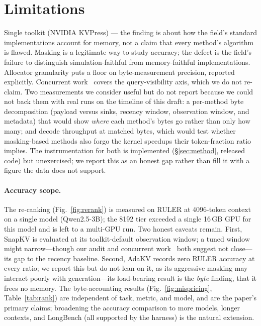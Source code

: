 \documentclass[11pt]{article}
\begin{document}
\section{Limitations}
\label{sec:limitations}
Single toolkit (NVIDIA KVPress) --- the finding is about how the field's standard implementations
account for memory, not a claim that every method's algorithm is flawed. Masking is a legitimate way
to study accuracy; the defect is the field's failure to distinguish simulation-faithful from
memory-faithful implementations. Allocator granularity puts a floor on byte-measurement precision,
reported explicitly. Concurrent work~\citep{luo2026queryvisibility} covers the query-visibility axis,
which we do not re-claim. Two measurements we consider useful but do not report because we could not
back them with real runs on the timeline of this draft: a per-method byte decomposition (payload
versus sinks, recency window, observation window, and metadata) that would show \emph{where} each
method's bytes go rather than only how many; and decode throughput at matched bytes, which would test
whether masking-based methods also forgo the kernel speedups their token-fraction ratio implies. The
instrumentation for both is implemented (\S\ref{sec:method}, released code) but unexercised; we report
this as an honest gap rather than fill it with a figure the data does not support.

\paragraph{Accuracy scope.} The re-ranking (Fig.~\ref{fig:rerank}) is measured on RULER at
4096-token context on a single model (Qwen2.5-3B); the 8192 tier exceeded a single 16\,GB GPU for
this model and is left to a multi-GPU run. Two honest caveats remain. First, SnapKV is evaluated at
its toolkit-default observation window; a tuned window might narrow---though our audit and
concurrent work~\citep{luo2026queryvisibility} both suggest not close---its gap to the recency
baseline. Second, AdaKV records zero RULER accuracy at every ratio; we report this but do not lean on
it, as its aggressive masking may interact poorly with generation---its load-bearing result is the
\emph{byte} finding, that it frees no memory. The byte-accounting results
(Fig.~\ref{fig:mispricing}, Table~\ref{tab:rank}) are independent of task, metric, and model, and are
the paper's primary claims; broadening the accuracy comparison to more models, longer contexts, and
LongBench (all supported by the harness) is the natural extension.
\end{document}
